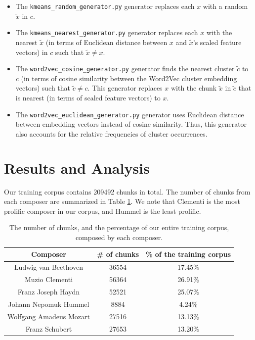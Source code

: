 \documentclass{article}
\begin{document}
\begin{itemize}
    \item The \texttt{kmeans\_random\_generator.py} generator replaces each $x$ with a random $\tilde{x}$ in $c$.
    \item The \texttt{kmeans\_nearest\_generator.py} generator replaces each $x$ with the nearest $\tilde{x}$ (in terms of Euclidean distance between $x$ and $\tilde{x}$'s scaled feature vectors) in $c$ such that $\tilde{x} \neq x$.
    \item The \texttt{word2vec\_cosine\_generator.py} generator finds the nearest cluster $\tilde{c}$ to $c$ (in terms of cosine similarity between the Word2Vec cluster embedding vectors) such that $\tilde{c} \neq c$. This generator replaces $x$ with the chunk $\tilde{x}$ in $\tilde{c}$ that is nearest (in terms of scaled feature vectors) to $x$.
    \item The \texttt{word2vec\_euclidean\_generator.py} generator uses Euclidean distance between embedding vectors instead of cosine similarity. Thus, this generator also accounts for the relative frequencies of cluster occurrences.
\end{itemize}

\section{Results and Analysis}

Our training corpus contains 209492 chunks in total. The number of chunks from each composer are summarized in Table \ref{tab:composer_chunks}. We note that Clementi is the most prolific composer in our corpus, and Hummel is the least prolific.

\begin{table}
    \centering
    \begin{tabular}{ccc}
        \toprule
        Composer & \# of chunks & \% of the training corpus \\
        \toprule
        Ludwig van Beethoven & 36554 & 17.45\% \\
        \midrule
        Muzio Clementi & 56364 & 26.91\% \\
        \midrule
        Franz Joseph Haydn & 52521 & 25.07\% \\
        \midrule
        Johann Nepomuk Hummel & 8884 & 4.24\% \\
        \midrule
        Wolfgang Amadeus Mozart & 27516 & 13.13\% \\
        \midrule
        Franz Schubert & 27653 & 13.20\% \\
        \bottomrule
    \end{tabular}
    \caption{The number of chunks, and the percentage of our entire training corpus, composed by each composer.}
    \label{tab:composer_chunks}
\end{table}
\end{document}
